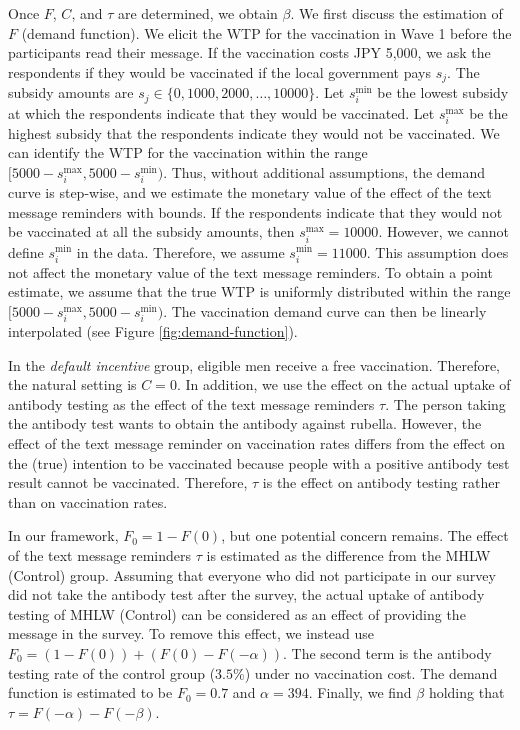 \documentclass[
    a4paper
]{article}
\begin{document}
Once \(F\), \(C\), and \(\tau\) are determined, we obtain \(\beta\). We first discuss the estimation of \(F\) (demand function). We elicit the WTP for the vaccination in Wave 1 before the participants read their message. If the vaccination costs JPY 5,000, we ask the respondents if they would be vaccinated if the local government pays \(s_j\). The subsidy amounts are \(s_j \in \{0, 1000, 2000, \ldots , 10000\}\). Let \(s_i^{\text{min}}\) be the lowest subsidy at which the respondents indicate that they would be vaccinated. Let \(s_i^{\text{max}}\) be the highest subsidy that the respondents indicate they would not be vaccinated. We can identify the WTP for the vaccination within the range \([5000 - s_i^{\text{max}}, 5000 - s_i^{\text{min}})\). Thus, without additional assumptions, the demand curve is step-wise, and we estimate the monetary value of the effect of the text message reminders with bounds. If the respondents indicate that they would not be vaccinated at all the subsidy amounts, then \(s_i^{\text{max}} = 10000\). However, we cannot define \(s_i^{\text{min}}\) in the data. Therefore, we assume \(s_i^{\text{min}} = 11000\). This assumption does not affect the monetary value of the text message reminders. To obtain a point estimate, we assume that the true WTP is uniformly distributed within the range \([5000 - s_i^{\text{max}}, 5000 - s_i^{\text{min}})\). The vaccination demand curve can then be linearly interpolated (see Figure \ref{fig:demand-function}).

In the \emph{default incentive} group, eligible men receive a free vaccination. Therefore, the natural setting is \(C=0\). In addition, we use the effect on the actual uptake of antibody testing as the effect of the text message reminders \(\tau\). The person taking the antibody test wants to obtain the antibody against rubella. However, the effect of the text message reminder on vaccination rates differs from the effect on the (true) intention to be vaccinated because people with a positive antibody test result cannot be vaccinated. Therefore, \(\tau\) is the effect on antibody testing rather than on vaccination rates.

In our framework, \(F_0=1-F(0)\), but one potential concern remains. The effect of the text message reminders \(\tau\) is estimated as the difference from the MHLW (Control) group. Assuming that everyone who did not participate in our survey did not take the antibody test after the survey, the actual uptake of antibody testing of MHLW (Control) can be considered as an effect of providing the message in the survey. To remove this effect, we instead use \(F_0=(1-F(0))+(F(0)-F(-\alpha))\). The second term is the antibody testing rate of the control group (\(3.5\)\%) under no vaccination cost. The demand function is estimated to be \(F_0=0.7\) and \(\alpha=394\). Finally, we find \(\beta\) holding that \(\tau=F(-\alpha)-F(-\beta)\).
\end{document}
